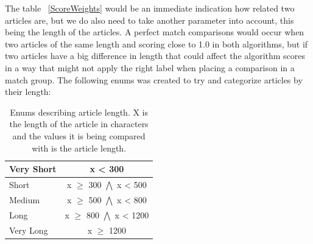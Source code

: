 The table ~\ref{ScoreWeights} would be an immediate indication how related two articles are, but we do also need to take another parameter into account, this being the length of the articles. A perfect match comparisons would occur when two articles of the same length and scoring close to 1.0 in both algorithms, but if two articles have a big difference in length that could affect the algorithm scores in a way that might not apply the right label when placing a comparison in a match group. The following enums was created to try and categorize articles by their length:

\begin{table}
\begin{center}
	\begin{tabular}{l | c}
	Very Short & x < 300\\ \hline
	Short & x $\geq$ 300 $\bigwedge$ x < 500\\ \hline
	Medium & x $\geq$ 500 $\bigwedge$ x < 800\\ \hline
	Long & x $\geq$ 800 $\bigwedge$ x < 1200\\ \hline
	Very Long & x $\geq$ 1200\\ \hline
	\end{tabular}
\end{center}
\caption{Enums describing article length. X is the length of the article in characters and the values it is being compared with is the article length.}
\end{table}





